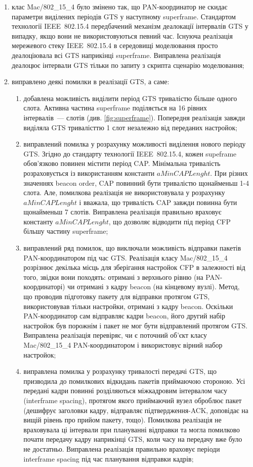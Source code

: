 \documentclass[a4paper,ukrainian,utf8,nocolumnsxix,floatsection,equationsection]{eskdtext}
\newcommand{\iee}[0]{IEEE~802.15.4\xspace}
\begin{document}
\begin{enumerate}
	\item клас Mac/802\_15\_4 було змінено так, що PAN-координатор не скидає параметри виділених періодів GTS у наступному superframe. Стандартом технології \iee передбачений механізм деалокації інтервалів GTS у випадку, якщо вони не використовуються певний час. Існуюча реалізація мережевого стеку \iee в середовищі моделювання просто деалоціювала всі GTS наприкінці superframe. Виправлена реалізація деалоцює інтервали GTS тільки по запиту з скрипта сценарію моделювання;

	\item виправлено деякі помилки в реалізації GTS, а саме:
	\begin{enumerate}
		\item добавлена можливість виділити період GTS тривалістю більше одного слота. Активна частина superframe поділяється на 16 рівних інтервалів~--- слотів (див. \cref{fig:superframe}). Попередня реалізація завжди виділяла GTS тривалісттю 1 слот незалежно від переданих настройок;

		\item виправлений помилка у розрахунку можливості виділення нового періоду GTS. Згідно до стандарту технології \iee, кожен supeframe обов’язково повинен містити період CAP. Мінімальна тривалість розраховується із використанням константи $aMinCAPLenght$. При різних значеннях beacon order, CAP повинний бути тривалістю щонайменьш 1-4 слота. Але, помилкова реалізація не використовувала у розрахунку $aMinCAPLenght$ і вважала, що тривалість CAP завжди повинна бути щонайменьш 7 слотів. Виправлена реалізація правильно враховує константу $aMinCAPLenght$, що дозволяє відводити під період CFP більшу частину superframe;

		\item виправлений ряд помилок, що виключали можливість відправки пакетів PAN-координатором під час GTS. Реалізація класу Mac/802\_15\_4 розрізнює декілька місць для зберігання настройок CFP в залежності від того, звідки вони походять: отримані з верхнього рівню (на PAN-координаторі) чи отримані з кадру beacon (на кінцевому вузлі). Метод, що проводив підготовку пакету для відправки протягом GTS, використовував тільки настройки, отримані з кадру beacon. Оскільки PAN-координатор сам відправляє кадри beacon, його другий набір настройок був порожнім і пакет не мог бути відправлений протягом GTS. Виправлена реалізація перевіряє, чи є поточний об’єкт класу Mac/802\_15\_4 PAN-координатором і використовує вірний набор настройок;

		\item виправлена помилка у розрахунку тривалості передачі GTS, що призводила до помилкових відкидань пакетів приймаючою стороною. Усі передані кадри повинні розділяються міжкадровим інтервалом часу (interframe spacing), протягом якого приймаючий вузел оброблює пакет (дешифрує заголовки кадру, відправляє підтвердження-ACK, доповідає на вищій рівень про прийом пакету, тощо). Помилкова реалізація не враховувала ці інтервали при плануванні відправки та могла помилково почати передачу кадру наприкінці GTS, коли часу на передачу вже було не достатньо. Виправлена реалізація правильно враховує періоди interframe spacing під час планування відправки кадрів;


\end{enumerate}
\end{enumerate}
\end{document}
